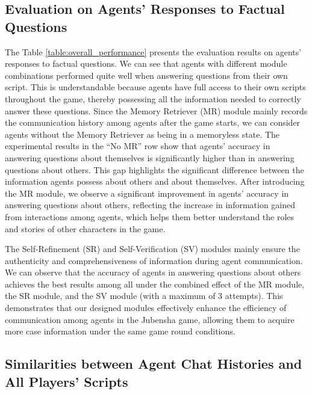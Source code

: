 \documentclass[11pt]{article}
\begin{document}
\subsection{Evaluation on Agents' Responses to Factual Questions}
The Table \ref{table:overall_performance} presents the evaluation results on agents' responses to factual questions. We can see that agents with different module combinations performed quite well when answering questions from their own script. This is understandable because agents have full access to their own scripts throughout the game, thereby possessing all the information needed to correctly answer these questions. Since the Memory Retriever (MR) module mainly records the communication history among agents after the game starts, we can consider agents without the Memory Retriever as being in a memoryless state. The experimental results in the ``No MR'' row show that agents' accuracy in answering questions about themselves is significantly higher than in answering questions about others. This gap highlights the significant difference between the information agents possess about others and about themselves. After introducing the MR module, we observe a significant improvement in agents' accuracy in answering questions about others, reflecting the increase in information gained from interactions among agents, which helps them better understand the roles and stories of other characters in the game.

The Self-Refinement (SR) and Self-Verification (SV) modules mainly ensure the authenticity and comprehensiveness of information during agent communication. We can observe that the accuracy of agents in answering questions about others achieves the best results among all under the combined effect of the MR module, the SR module, and the SV module (with a maximum of 3 attempts). This demonstrates that our designed modules effectively enhance the efficiency of communication among agents in the Jubensha game, allowing them to acquire more case information under the same game round conditions.

\subsection{Similarities between Agent Chat Histories and All Players' Scripts}
\end{document}
